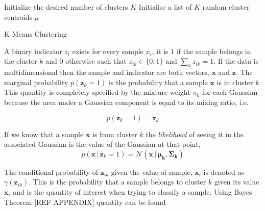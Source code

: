 \begin{algorithm}
    \SetAlgoLined
    Initialize the desired number of clusters $K$\;
    Initialise a list of $K$ random cluster centroids $\mu$\;
    \caption{K Means Clustering \cite{oreilly_python}}
    \label{algorithm:em}
\end{algorithm}















A binary indicator $z_{i}$ exists for every sample $x_i$, it is 1 if the sample belongs in the cluster $k$ and 0 otherwise such that $z_{ik} \in \{0, 1\}$ and $\sum_k z_{ik} = 1$. If the data is multidimensional then the sample and indicator are both vectors, $\bm{x}$ and $\bm{z}$. The marginal probability $p(\bm{z}_{k} = 1)$ is the probability that a sample $\bm{x}$ is in cluster $k$. This quantity is completely specified by the mixture weight $\pi_k$ for each Gaussian because the area under a Gaussian component is equal to its mixing ratio, i.e.

\begin{equation}
	\label{eq:marginalk}
	p(\bm{z}_{k}=1) = \pi_k 
\end{equation}
	
If we know that a sample $\bm{x}$ is from cluster $k$ the \emph{likelihood} of seeing it in the associated Gaussian is the value of the Gaussian at that point,
\begin{equation}
	\label{eq:cond}
	p(\bm{x}\, |\, \bm{z}_{k} = 1) = \mathcal{N}(\bm{x}\, |\,\bm{\mu_k}, \bm{\Sigma_k})
\end{equation}

The conditional probability of $\bm{z}_{ik}$ given the value of sample, $\bm{x}_i$ is denoted as $\gamma(\bm{z}_{ik})$. This is the probability that a sample belongs to cluster $k$ given its value $\bm{x}_i$ and is the quantity of interest when trying to classify a sample.  Using Bayes Theorem [REF APPENDIX] quantity can be found 

